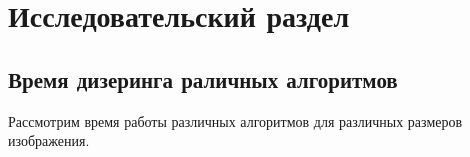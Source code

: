 \chapter{Исследовательский раздел}
\label{cha:research}
\section{Время дизеринга раличных алгоритмов}

Рассмотрим время работы различных алгоритмов для различных размеров изображения.


